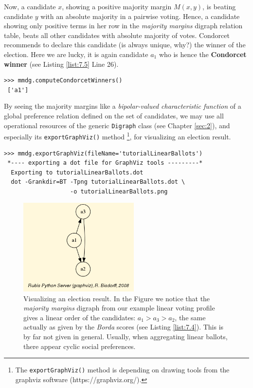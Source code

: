 Now, a candidate $x$, showing a positive majority margin $M(x,y)$, is beating candidate $y$  with an absolute majority in a pairwise voting. Hence, a candidate showing only positive terms in her row in the \emph{majority margins} digraph relation table, beats all other candidates with absolute majority of votes. Condorcet recommends to declare this candidate (is always unique, why?) the winner of the election. Here we are lucky, it is again candidate $a_1$ who is hence the \textbf{Condorcet winner} (see Listing \ref{list:7.5} Line 26).

\begin{lstlisting}[basicstyle=\footnotesize]
>>> mmdg.computeCondorcetWinners()
 ['a1']  
\end{lstlisting}    

By seeing the majority margins like a \emph{bipolar-valued characteristic function} of a global preference relation defined on the set of candidates, we may use all operational resources of the generic \texttt{Digraph} class (see Chapter \ref{sec:2}), and especially its \texttt{exportGraphViz()} method \footnote{The \texttt{exportGraphViz()} method is depending on drawing tools from the graphviz software (https://graphviz.org/).}, for visualizing an election result.
\begin{lstlisting}[basicstyle=\footnotesize]
>>> mmdg.exportGraphViz(fileName='tutorialLinearBallots')
 *---- exporting a dot file for GraphViz tools ---------*
  Exporting to tutorialLinearBallots.dot
  dot -Grankdir=BT -Tpng tutorialLinearBallots.dot \
                   -o tutorialLinearBallots.png
\end{lstlisting}
\begin{figure}[h]
\sidecaption
\includegraphics[width=6cm]{Figures/tutorialLinearBallots.png}
\caption{Visualizing an election result. In the Figure we notice that the \emph{majority margins} digraph from our example linear voting profile gives a linear order of the candidates: $a_1 > a_3 > a_2$, the same actually as given by the \emph{Borda} scores (see Listing \ref{list:7.4}). This is by far not given in general. Usually, when aggregating linear ballots, there appear cyclic social preferences.
}
\label{fig:7.1}       %
\end{figure}

